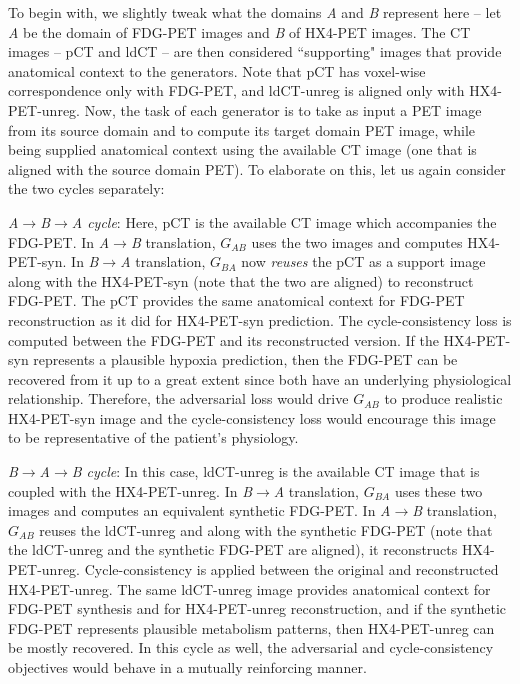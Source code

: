 To begin with, we slightly tweak what the domains \textit{A} and \textit{B} represent here -- let \textit{A} be the domain of FDG-PET images and \textit{B} of HX4-PET images. The CT images -- pCT and ldCT -- are then considered ``supporting" images that provide anatomical context to the generators. Note that pCT has voxel-wise correspondence only with FDG-PET, and ldCT-unreg is aligned only with HX4-PET-unreg. Now, the task of each generator is to take as input a PET image from its source domain and to compute its target domain PET image, while being supplied anatomical context using the available CT image (one that is aligned with the source domain PET). To elaborate on this, let us again consider the two cycles separately: 

\vspace{4mm}
\noindent
\textit{A$\rightarrow$B$\rightarrow$A cycle}: Here, pCT is the available CT image which accompanies the FDG-PET. In \textit{A}$\rightarrow$\textit{B} translation, $G_{AB}$ uses the two images and computes HX4-PET-syn. In \textit{B}$\rightarrow$\textit{A} translation, $G_{BA}$ now \textit{reuses} the pCT as a support image along with the HX4-PET-syn (note that the two are aligned) to reconstruct FDG-PET. The pCT provides the same anatomical context for FDG-PET reconstruction as it did for HX4-PET-syn prediction. The cycle-consistency loss is computed between the FDG-PET and its reconstructed version. If the HX4-PET-syn represents a plausible hypoxia prediction, then the FDG-PET can be recovered from it up to a great extent since both have an underlying physiological relationship. Therefore, the adversarial loss would drive $G_{AB}$ to produce realistic HX4-PET-syn image and the cycle-consistency loss would encourage this image to be representative of the patient's physiology. 

\vspace{4mm}
\noindent
\textit{B$\rightarrow$A$\rightarrow$B cycle}: In this case, ldCT-unreg is the available CT image that is coupled with the HX4-PET-unreg. In \textit{B}$\rightarrow$\textit{A} translation, $G_{BA}$ uses these two images and computes an equivalent synthetic FDG-PET. In \textit{A}$\rightarrow$\textit{B} translation, $G_{AB}$ reuses the ldCT-unreg and along with the synthetic FDG-PET (note that the ldCT-unreg and the synthetic FDG-PET are aligned), it reconstructs HX4-PET-unreg. Cycle-consistency is applied between the original and reconstructed HX4-PET-unreg. The same ldCT-unreg image provides anatomical context for FDG-PET synthesis and for HX4-PET-unreg reconstruction, and if the synthetic FDG-PET represents plausible metabolism patterns, then HX4-PET-unreg can be mostly recovered. In this cycle as well, the adversarial and cycle-consistency objectives would behave in a mutually reinforcing manner.

